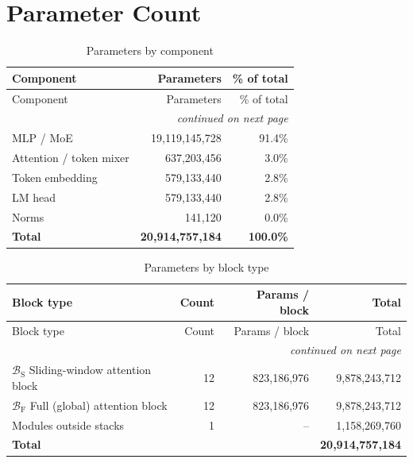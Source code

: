 \documentclass[10pt,a4paper]{article}
\theoremstyle{definition}
\begin{document}
\section{Parameter Count}
\begin{longtable}{lrr}
\caption{Parameters by component}\\
\toprule
Component & Parameters & \% of total \\
\midrule
\endfirsthead
\toprule
Component & Parameters & \% of total \\
\midrule
\endhead
\midrule \multicolumn{3}{r}{\textit{continued on next page}} \\
\endfoot
\bottomrule
\endlastfoot
MLP / MoE & 19,119,145,728 & 91.4\% \\
Attention / token mixer & 637,203,456 & 3.0\% \\
Token embedding & 579,133,440 & 2.8\% \\
LM head & 579,133,440 & 2.8\% \\
Norms & 141,120 & 0.0\% \\
\midrule \textbf{Total} & \textbf{20,914,757,184} & \textbf{100.0\%} \\
\end{longtable}
\begin{longtable}{p{8cm}rrr}
\caption{Parameters by block type}\\
\toprule
Block type & Count & Params / block & Total \\
\midrule
\endfirsthead
\toprule
Block type & Count & Params / block & Total \\
\midrule
\endhead
\midrule \multicolumn{4}{r}{\textit{continued on next page}} \\
\endfoot
\bottomrule
\endlastfoot
$\mathcal{B}_{\mathrm{S}}$ Sliding-window attention block & 12 & 823,186,976 & 9,878,243,712 \\
$\mathcal{B}_{\mathrm{F}}$ Full (global) attention block & 12 & 823,186,976 & 9,878,243,712 \\
Modules outside stacks & 1 & -- & 1,158,269,760 \\
\midrule \textbf{Total} & & & \textbf{20,914,757,184} \\
\end{longtable}
\end{document}
